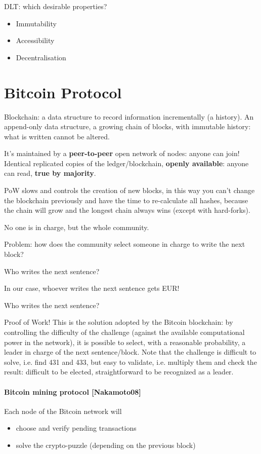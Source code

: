 DLT: which desirable properties?
\begin{itemize}
    \item Immutability
    \item Accessibility
    \item Decentralisation
\end{itemize}

\section{Bitcoin Protocol}

Blockchain: a data structure to record information incrementally (a history). An append-only data structure, a growing chain of blocks, with immutable history: what is written cannot be altered.

It's maintained by a \textbf{peer-to-peer} open network of nodes: anyone can join! Identical replicated copies of the ledger/blockchain, \textbf{openly available}: anyone can read, \textbf{true by majority}.

PoW slows and controls the creation of new blocks, in this way you can't change the blockchain previously and have the time to re-calculate all hashes, because the chain will grow and the longest chain always wins (except with hard-forks).

No one is in charge, but the whole community.

Problem: how does the community select someone in charge to write the next block?

Who writes the next sentence?

In our case, whoever writes the next sentence gets  EUR!

Who writes the next sentence?

Proof of Work! This is the solution adopted by the Bitcoin blockchain: by controlling the difficulty of the challenge (against the available computational power in the network), it is possible to select, with a reasonable probability, a leader in charge of the next sentence/block. Note that the challenge is difficult to solve, i.e. find 431 and 433, but easy to validate, i.e. multiply them and check the result: difficult to be elected, straightforward to be recognized as a leader.

\paragraph*{Bitcoin mining protocol [Nakamoto08]}
Each node of the Bitcoin network will
\begin{itemize}
    \item choose and verify pending transactions
    \item solve the crypto-puzzle (depending on the previous block)
\end{itemize}

